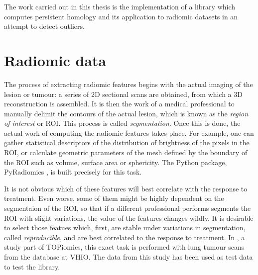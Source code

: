 \documentclass[../main.tex]{subfiles}
\begin{document}
The work carried out in this thesis is the implementation of a library which computes
persistent homology and its application to radiomic datasets in an attempt to detect
outliers. 

\section{Radiomic data}
The process of extracting radiomic features begins with the actual imaging of the lesion
or tumour: a series of 2D sectional scans are obtained, from which a 3D reconstruction is
assembled. It is then the work of a medical professional to manually delimit the contours
of the actual lesion, which is known as the \emph{region of interest} or ROI. This process is
called \emph{segmentation}. Once this is done, the actual work of computing the radiomic
features takes place. For example, one can gather statistical descriptors of the
distribution of brightness of the pixels in the ROI, or calculate geometric parameters of
the mesh defined by the boundary of the ROI such as volume, surface area or sphericity.
The Python package, \textsf{PyRadiomics} \cite{pyradiomics}, is built precisely for this
task. 

It is not obvious which of these features will best correlate with the response to
treatment. Even worse, some of them might be highly dependent on the segmentaion of the
ROI, so that if a different professional performs segments the ROI with slight variations,
the value of the features changes wildly. It is desirable to select those featues which,
first, are stable under variations in segmentation, called \emph{reproducible}, and are
best correlated to the response to treatment. In \cite{features}, a study part of
TOPiomics, this exact task is performed with lung tumour scans from the database at VHIO.
The data from this study has been used as test data to test the library.
\end{document}
